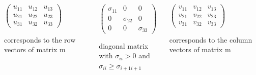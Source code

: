 \documentclass{beamer}
\begin{document}
{  \begin{block}{}
    \begin{columns}
      \begin{column}{4cm}
        \pause
        \begin{math}
          \begin{pmatrix} u_{11} & u_{12} & u_{13} \\ u_{21} & u_{22} & u_{23} \\ u_{31} & u_{32} & u_{33} \end{pmatrix}
        \end{math}
        \begin{block}{}
          corresponds to the row vectors of matrix m
          \hfill
        \end{block}
      \end{column}
      \begin{column}{4cm}
        \pause
        \begin{math}
          \begin{pmatrix} \sigma_{11} & 0 & 0 \\ 0 & \sigma_{22} & 0 \\ 0 & 0 & \sigma_{33} \end{pmatrix}
        \end{math}
        \begin{block}{}
          diagonal matrix\\ with $\sigma_{ii} > 0$ and $\sigma_{ii} \geq \sigma_{i+1 i+1}$
        \end{block}
      \end{column}
      \begin{column}{4cm}
        \pause
        \begin{math}
          \begin{pmatrix} v_{11} & v_{12} & v_{13} \\ v_{21} & v_{22} & v_{23} \\ v_{31} & v_{32} & v_{33} \end{pmatrix}
        \end{math}
        \begin{block}{}
          corresponds to the column vectors of matrix m
          \hfill
        \end{block}
      \end{column}
    \end{columns}
  \end{block}





}
\end{document}
